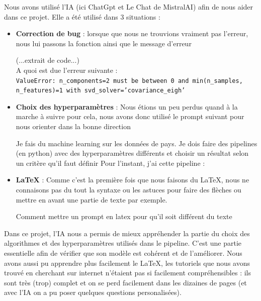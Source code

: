 \documentclass{article}
\begin{document}
\noindent Nous avons utilisé l'IA (ici ChatGpt et Le Chat de MistralAI) afin de nous aider dans ce projet. Elle a été utilisé dans 3 situations : \\
\begin{itemize}
    \item \textbf{Correction de bug} : lorsque que nous ne trouvions vraiment pas l'erreur, nous lui passons la fonction ainsi que le message d'erreur
    \begin{tcolorbox}[colback=gray!10, colframe=black, title=Prompt (dans Le Chat)]
        (...extrait de code...) \\
        A quoi est due l'erreur suivante : \\
        \texttt{ValueError: n\_components=2 must be between 0 and min(n\_samples, n\_features)=1 with svd\_solver='covariance\_eigh'}
    \end{tcolorbox}
    \item \textbf{Choix des hyperparamètres} : Nous étions un peu perdus quand à la marche à suivre pour cela, nous avons donc utilisé le prompt suivant pour nous orienter dans la bonne direction 
    \begin{tcolorbox}[colback=gray!10, colframe=black, title=Prompt]
Je fais du machine learning sur les données de pays. Je dois faire des pipelines (en python) avec des hyperparamètres différents et choisir un résultat selon un critère qu'il faut définir
Pour l'instant, j'ai cette pipeline :
\end{tcolorbox}
    \item \textbf{LaTeX} : Comme c'est la première fois que nous faisons du LaTeX, nous ne connaisons pas du tout la syntaxe ou les astuces pour faire des flèches ou mettre en avant une partie de texte par exemple.
        \begin{tcolorbox}[colback=gray!10, colframe=black, title=Prompt]
Comment mettre un prompt en latex pour qu'il soit différent du texte 
\end{tcolorbox}
\end{itemize} 

\vspace{1cm}
\noindent Dans ce projet, l'IA nous a permis de mieux appréhender la partie du choix des algorithmes et des hyperparamètres utilisés dans le pipeline. C'est une partie essentielle afin de vérifier que son modèle est cohérent et de l'améliorer. Nous avons aussi pu apprendre plus facilement le LaTeX, les tutoriels que nous avons trouvé en cherchant sur internet n'étaient pas si facilement compréhensibles : ils sont très (trop) complet et on se perd facilement dans les dizaines de pages (et avec l'IA on a pu poser quelques questions personalisées).
\end{document}
